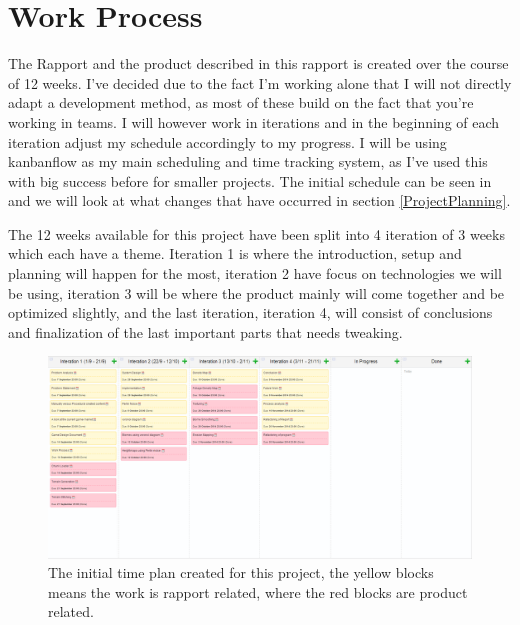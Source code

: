 \section{Work Process}
\label{WorkProcess}
The Rapport and the product described in this rapport is created over the course of 12 weeks. I've decided due to the fact I'm working alone that I will not directly adapt a development method, as most of these build on the fact that you're working in teams. I will however work in iterations and in the beginning of each iteration adjust my schedule accordingly to my progress. I will be using kanbanflow as my main scheduling and time tracking system, as I've used this with big success before for smaller projects. The initial schedule can be seen in  and we will look at what changes that have occurred in section \ref{ProjectPlanning}.

The 12 weeks available for this project have been split into 4 iteration of 3 weeks which each have a theme. Iteration 1 is where the introduction, setup and planning will happen for the most, iteration 2 have focus on technologies we will be using, iteration 3 will be where the product mainly will come together and be optimized slightly, and the last iteration, iteration 4, will consist of conclusions and finalization of the last important parts that needs tweaking.


\begin{figure}[H]
	\includegraphics[width=1\linewidth]{img/InitTimeplan}
	\centering
	\caption{The initial time plan created for this project, the yellow blocks means the work is rapport related, where the red blocks are product related.}
	\label{fig:InitTimeplan}
\end{figure}
